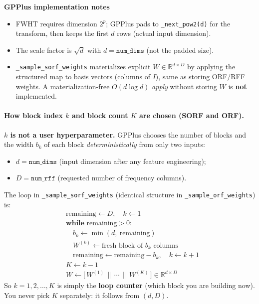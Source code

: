 \documentclass[11pt]{article}
\begin{document}
\textbf{GPPlus implementation notes}
\begin{itemize}
  \item FWHT requires dimension $2^{p}$; GPPlus pads to \texttt{\_next\_pow2(d)} for the transform,
        then keeps the first $d$ rows (actual input dimension).
  \item The scale factor is $\sqrt{d}$ with $d=\texttt{num\_dims}$ (not the padded size).
  \item \texttt{\_sample\_sorf\_weights} materializes explicit $W\in\mathbb{R}^{d\times D}$ by applying
        the structured map to basis vectors (columns of $I$), same as storing ORF/RFF weights.
        A materialization-free $O(d\log d)$ \emph{apply} without storing $W$ is \textbf{not} implemented.
\end{itemize}

\paragraph{How block index $k$ and block count $K$ are chosen (SORF and ORF).}
\label{par:sorf-block-k}
\textbf{$k$ is not a user hyperparameter.} GPPlus chooses the number of blocks and the width $b_k$ of each block
\emph{deterministically} from only two inputs:
\begin{itemize}[nosep]
  \item $d = \texttt{num\_dims}$ (input dimension after any feature engineering);
  \item $D = \texttt{num\_rff}$ (requested number of frequency columns).
\end{itemize}
The loop in \texttt{\_sample\_sorf\_weights} (identical structure in \texttt{\_sample\_orf\_weights}) is:
\begin{equation}
  \label{eq:block-loop}
  \begin{aligned}
    &\mathrm{remaining} \leftarrow D,\quad k \leftarrow 1 \\
    &\textbf{while\ }\mathrm{remaining} > 0: \\
    &\quad b_k \leftarrow \min(d,\ \mathrm{remaining}) \\
    &\quad W^{(k)} \leftarrow \text{fresh block of } b_k \text{ columns} \\
    &\quad \mathrm{remaining} \leftarrow \mathrm{remaining} - b_k,\quad k \leftarrow k+1 \\
    &K \leftarrow k-1 \\
    &W \leftarrow \bigl[\,W^{(1)} \,\|\, \cdots \,\|\, W^{(K)}\,\bigr]
      \in \mathbb{R}^{d\times D}
  \end{aligned}
\end{equation}
So $k=1,2,\ldots,K$ is simply the \textbf{loop counter} (which block you are building now).
You never pick $K$ separately: it follows from $(d,D)$.
\end{document}

